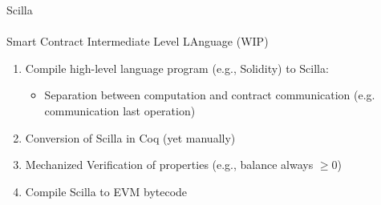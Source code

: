 \begin{frame}{Scilla}
\framesubtitle{\cite{scilla}}
\begin{block}{Smart Contract Intermediate Level LAnguage (WIP)}
\begin{enumerate}
\item Compile high-level language program (e.g., Solidity) to Scilla:
\begin{itemize}
\item Separation between computation and contract communication (e.g. communication last operation)
\end{itemize}
\item Conversion of Scilla in Coq (yet manually)
\item Mechanized Verification of properties (e.g., balance always $\geq 0$)
\item Compile Scilla to EVM bytecode
\end{enumerate}
\end{block}

\end{frame}
